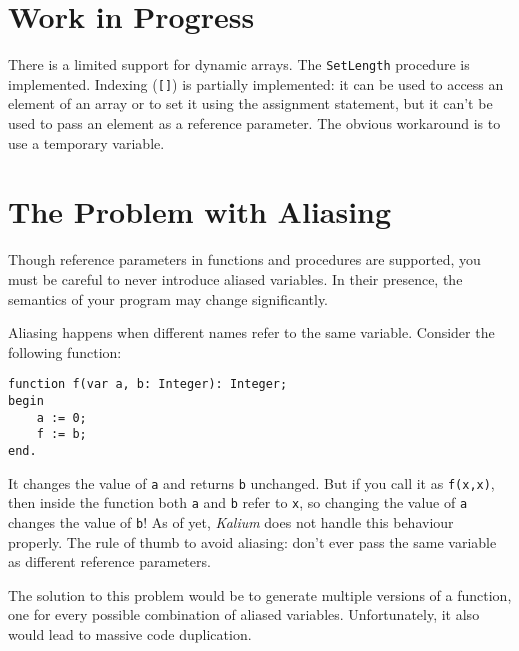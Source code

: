 \documentclass [a4paper] {article}
\begin{document}
\section { Work in Progress }

There is a limited support for dynamic arrays. The \texttt{SetLength} procedure
is implemented. Indexing (\texttt{[]}) is partially implemented: it can be used
to access an element of an array or to set it using the assignment statement,
but it can't be used to pass an element as a reference parameter. The obvious
workaround is to use a temporary variable.

\section { The Problem with Aliasing }

Though reference parameters in functions and procedures are supported, you must
be careful to never introduce aliased variables. In their presence, the
semantics of your program may change significantly.

Aliasing happens when different names refer to the same variable. Consider the
following function:

\begin{lstlisting}
function f(var a, b: Integer): Integer;
begin
    a := 0;
    f := b;
end.
\end{lstlisting}

It changes the value of \texttt{a} and returns \texttt{b} unchanged. But if you
call it as \texttt{f(x,x)}, then inside the function both \texttt{a} and
\texttt{b} refer to \texttt{x}, so changing the value of \texttt{a} changes the
value of \texttt{b}! As of yet, \emph{Kalium} does not handle this behaviour
properly. The rule of thumb to avoid aliasing: don't ever pass the same variable
as different reference parameters.

The solution to this problem would be to generate multiple versions of a
function, one for every possible combination of aliased variables.
Unfortunately, it also would lead to massive code duplication.
\end{document}
